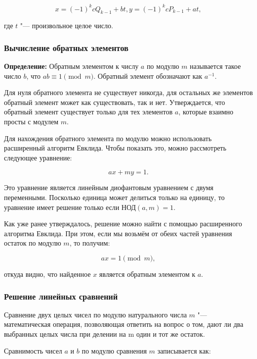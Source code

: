 \documentclass[bachelor, och, labwork]{shiza}
\begin{document}
            $$x = (-1)^k c Q_{k-1} + bt, y = (-1)^k c P_{k-1} + at,$$

            где $t$ "--- произвольное целое число.

        \subsubsection{Вычисление обратных элементов}

            \textbf{Определение:} Обратным элементом к числу $a$ по модулю $m$
            называется такое число $b$, что $ab \equiv 1 \pmod m$. Обратный
            элемент обозначают как $a^{-1}$.

            Для нуля обратного элемента не существует никогда, для остальных же
            элементов обратный элемент может как существовать, так и нет.
            Утверждается, что обратный элемент существует только для тех
            элементов $a$, которые взаимно просты с модулем $m$.

            Для нахождения обратного элемента по модулю можно использовать
            расширенный алгоритм Евклида. Чтобы показать это, можно рассмотреть
            следующее уравнение:

            $$ax + my = 1.$$

            Это уравнение является линейным диофантовым уравнением с двумя
            переменными. Посколько единица может делиться только на единицу, то
            уравнение имеет решение только если НОД$(a, m) = 1$.

            Как уже ранее утверждалось, решение можно найти с помощью
            расширенного алгоритма Евклида. При этом, если мы возьмём от обеих
            частей уравнения остаток по модулю $m$, то получим:

            $$ax = 1 \pmod m,$$

            откуда видно, что найденное $x$ является обратным элементом к $a$.

        \subsubsection{Решение линейных сравнений}

            Сравнение двух целых чисел по модулю натурального числа $m$ "---
            математическая операция, позволяющая ответить на вопрос о том, дают
            ли два выбранных целых числа при делении на m один и тот же остаток.

            Сравнимость чисел $a$ и $b$ по модулю сравнения $m$ записывается
            как:
\end{document}
